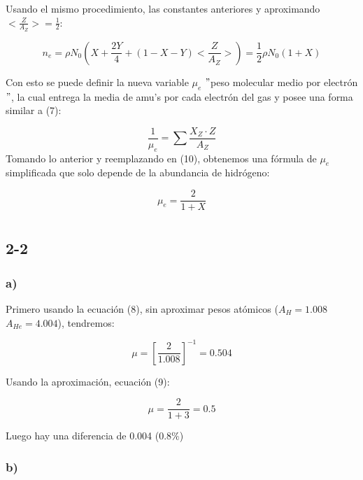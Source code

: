 \documentclass[2pt]{article}
\begin{document}
Usando el mismo procedimiento, las constantes anteriores y aproximando $<\frac{Z}{A_Z}> =\frac{1}{2}$:

\begin{equation}
n_e=\rho N_0 (X + \frac{2Y}{4} + (1-X-Y)<\frac{Z}{A_Z}> ) = \frac{1}{2}\rho N_0 (1+X)
\end{equation}

Con esto se puede definir la nueva variable $\mu_e$ $"$peso molecular medio por electrón$"$, la cual entrega la media de amu's por cada electrón del gas y posee una forma similar a (7):

\begin{equation}
\frac{1}{\mu_e}=\sum \frac{X_Z\cdot Z}{A_Z}
\end{equation}
Tomando lo anterior y reemplazando en (10), obtenemos una fórmula de $\mu_e$ simplificada que solo depende de la abundancia de hidrógeno:

\begin{equation}
\mu_e=\frac{2}{1+X}
\end{equation}

\section{}

\subsection*{2-2}

\subsubsection*{a)}

Primero usando la ecuación (8), sin aproximar pesos atómicos ($A_H=1.008$ $A_{He}=4.004$), tendremos:

\begin{equation}
\mu=[\frac{2}{1.008}]^{-1}=0.504
\end{equation} 

Usando la aproximación, ecuación (9):

\begin{equation}
\mu = \frac{2}{1+3} = 0.5
\end{equation}

Luego hay una diferencia de 0.004 (0.8$\%$)

\subsubsection*{b)}
\end{document}
